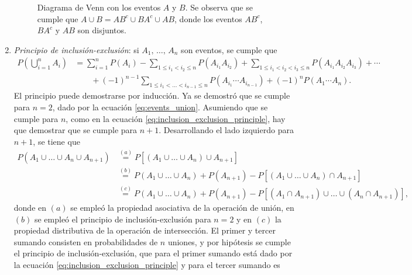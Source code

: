 \documentclass[a4paper]{report}
\begin{document}
\begin{enumerate}
\begin{figure}[!htb]
\begin{minipage}[c]{0.37\textwidth}
  \end{minipage}\hfill
  \begin{minipage}[c]{0.53\textwidth}
    \caption{
       Diagrama de Venn con los eventos \(A\) y \(B\). Se observa que se cumple que \(A\cup B=AB^c\cup BA^c\cup AB\), donde los eventos  \(AB^c\), \(BA^c\) y \(AB\) son disjuntos. 
    } \label{fig:sets_union_probability}
  \end{minipage}
\end{figure}
\item \emph{Principio de inclusión-exclusión}: si \(A_1,\,\dots,\,A_n\) son eventos, se cumple que
\begingroup
\addtolength{\jot}{1em}
\begin{equation}\label{eq:inclusion_exclusion_principle}
 \begin{aligned}
 P\left(\bigcup_{i=1}^nA_i\right)&=\sum_{i=1}^nP(A_i)-\sum_{1\leq i_1 < i_2\leq n}P(A_{i_1}A_{i_2})+\sum_{1\leq i_1 < i_2 < i_3\leq n}P(A_{i_1}A_{i_2}A_{i_3})+\cdots\\
   &\qquad+(-1)^{n-1}\sum_{1\leq i_1 <\dots< i_{n-1}\leq n}P(A_{i_1}\cdots A_{i_{n-1}})+(-1)^nP(A_1\cdots A_n).
\end{aligned}
\end{equation}
\endgroup 
El principio puede demostrarse por inducción. Ya se demostró que se cumple para \(n=2\), dado por la ecuación \ref{eq:events_union}. Asumiendo que se cumple para \(n\), como en la ecuación \ref{eq:inclusion_exclusion_principle}, hay que demostrar que se cumple para \(n+1\). Desarrollando el lado izquierdo para \(n+1\), se tiene que
\begin{align}\label{eq:inclusion_exclusion_principle_tmp}
 P(A_1\cup\dots\cup A_n\cup A_{n+1})&\overset{(a)}{=}P[(A_1\cup\dots\cup A_n)\cup A_{n+1}]\nonumber\\
  &\overset{(b)}{=}P(A_1\cup\dots\cup A_n)+P(A_{n+1})-P[(A_1\cup\dots\cup A_n)\cap A_{n+1}]\nonumber\\
  &\overset{(c)}{=}P(A_1\cup\dots\cup A_n)+P(A_{n+1})-P[(A_1\cap A_{n+1})\cup\dots\cup(A_n\cap A_{n+1})],
\end{align}
donde en \((a)\) se empleó la propiedad asociativa de la operación de unión, en \((b)\) se empleó el principio de inclusión-exclusión para \(n=2\) y en \((c)\) la propiedad distributiva de la operación de intersección. El primer y tercer sumando consisten en probabilidades de \(n\) uniones, y por hipótesis se cumple el principio de inclusión-exclusión, que para el primer sumando está dado por la ecuación \ref{eq:inclusion_exclusion_principle} y para el tercer sumando es

\end{enumerate}
\end{document}

